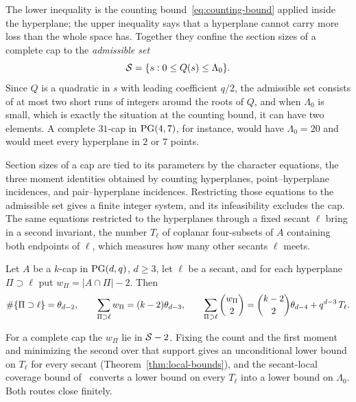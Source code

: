 The lower inequality is the counting bound~\eqref{eq:counting-bound}
applied inside the hyperplane; the upper inequality says that a
hyperplane cannot carry more loss than the whole space has.  Together they
confine the section sizes of a complete cap to the \emph{admissible set}
\begin{equation}
 \mathcal S=\{s:0\le Q(s)\le\Lambda_0\}.
\label{eq:admissible}
\end{equation}
Since \(Q\) is a quadratic in \(s\) with leading coefficient \(q/2\), the
admissible set consists of at most two short runs of integers around the
roots of \(Q\), and when \(\Lambda_0\) is small, which is exactly the
situation at the counting bound, it can have two elements.  A complete
\(31\)-cap in \(\mathrm{PG}(4,7)\), for instance, would have \(\Lambda_0=20\) and
would meet every hyperplane in \(2\) or \(7\) points.

Section sizes of a cap are tied to its parameters by the character
equations, the three moment identities obtained by counting hyperplanes,
point--hyperplane incidences, and pair--hyperplane incidences.  Restricting
those equations to the admissible set gives a finite integer system, and
its infeasibility excludes the cap.  The same equations restricted to the
hyperplanes through a fixed secant \(\ell\) bring in a second invariant,
the number \(T_\ell\) of coplanar four-subsets of \(A\) containing both
endpoints of \(\ell\), which measures how many other secants \(\ell\)
meets.

\begin{theorem}
\label{thm:secant-hyperplane-moments}
Let \(A\) be a \(k\)-cap in \(\mathrm{PG}(d,q)\), \(d\ge3\), let \(\ell\) be a
secant, and for each hyperplane \(\Pi\supset\ell\) put
\(w_\Pi=|A\cap\Pi|-2\).  Then
\begin{equation}
 \#\{\Pi\supset\ell\}=\theta_{d-2},
 \qquad
 \sum_{\Pi\supset\ell}w_\Pi=(k-2)\theta_{d-3},
 \qquad
 \sum_{\Pi\supset\ell}\binom{w_\Pi}{2}=\binom{k-2}{2}\theta_{d-4}+q^{d-3}\,T_\ell .
\label{eq:moments-intro}
\end{equation}
\end{theorem}

For a complete cap the \(w_\Pi\) lie in \(\mathcal S-2\).  Fixing the count and
the first moment and minimizing the second over that support gives an
unconditional lower bound on \(T_\ell\) for every secant
(Theorem~\ref{thm:local-bounds}), and the secant-local coverage bound
of~\cite{RuddSecantDefects} converts a lower bound on every \(T_\ell\)
into a lower bound on \(\Lambda_0\).  Both routes close finitely.

